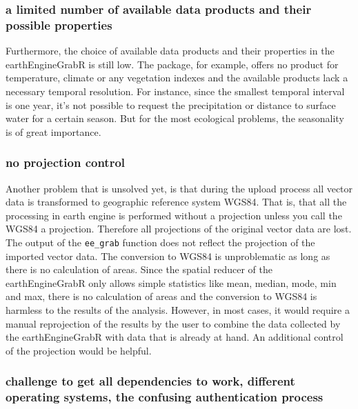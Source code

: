 \documentclass[11pt,twoside,a4paper,final]{report}
\begin{document}
\subsubsection{a limited number of available data products and their possible properties}

Furthermore, the choice of available data products and their properties in the earthEngineGrabR is still low. The package, for example, offers no product for temperature, climate or any vegetation indexes and the available products lack a necessary temporal resolution. For instance, since the smallest temporal interval is one year, it's not possible to request the precipitation or distance to surface water for a certain season. But for the most ecological problems, the seasonality is of great importance.


\subsubsection{no projection control}

Another problem that is unsolved yet, is that during the upload process all vector data is transformed to geographic reference system WGS84. That is, that all the processing in earth engine is performed without a projection unless you call the WGS84 a projection. Therefore all projections of the original vector data are lost. The output of the \texttt{ee\_grab} function does not reflect the projection of the imported vector data. The conversion to WGS84 is unproblematic as long as there is no calculation of areas. Since the spatial reducer of the earthEngineGrabR only allows simple statistics like mean, median, mode, min and max, there is no calculation of areas and the conversion to WGS84 is harmless to the results of the analysis. However, in most cases, it would require a manual reprojection of the results by the user to combine the data collected by the earthEngineGrabR with data that is already at hand. An additional control of the projection would be helpful.

\subsubsection{challenge to get all dependencies to work, different operating systems, the confusing authentication process}
 
\end{document}

